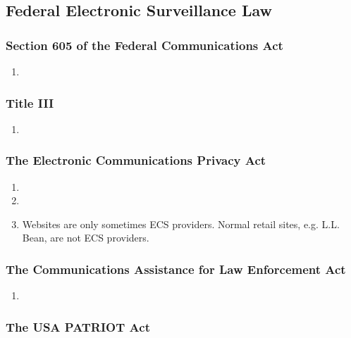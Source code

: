 \subsection{Federal Electronic Surveillance Law}

\subsubsection{Section 605 of the Federal Communications Act}

\begin{enumerate}
    \item %
\end{enumerate}

\subsubsection{Title III}

\begin{enumerate}
    \item %
\end{enumerate}

\subsubsection{The Electronic Communications Privacy Act}

\begin{enumerate}
    \item %
    \item %
    \item Websites are only sometimes ECS providers. Normal retail sites, e.g. 
    L.L. Bean, are not ECS providers.
\end{enumerate}

\subsubsection{The Communications Assistance for Law Enforcement Act}

\begin{enumerate}
    \item %
\end{enumerate}

\subsubsection{The USA PATRIOT Act}

